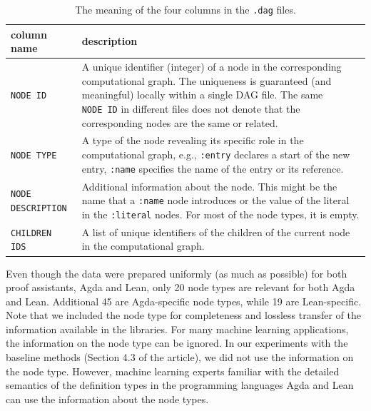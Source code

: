 \documentclass{article}
\begin{document}
\begin{table}[!htb]
    \caption{The meaning of the four columns in the \texttt{.dag} files.\label{tab:dag-columns}}
    \begin{center}
        \begin{tabular}{l|p{10cm}}
            column name & description \\
            \hline
            \texttt{NODE ID} &
            A unique identifier (integer) of a node in the corresponding computational graph. The uniqueness is guaranteed (and meaningful) locally within a single DAG file. The same \texttt{NODE~ID} in different files does not denote that the corresponding nodes are the same or related.\\
            \rule{0pt}{3ex}
            \texttt{NODE TYPE} &
            A type of the node revealing its specific role in the computational graph, e.g., \texttt{:entry} declares a start of the new entry, \texttt{:name} specifies the name of the entry or its reference.\\
            \rule{0pt}{3ex}
            \texttt{NODE DESCRIPTION} &
            Additional information about the node. This might be the name that a \texttt{:name} node introduces or the value of the literal in the \texttt{:literal} nodes. For most of the node types, it is empty.\\
            \rule{0pt}{3ex}
            \texttt{CHILDREN IDS} & A list of unique identifiers of the children of the current node in the computational graph.
        \end{tabular}
    \end{center}
\end{table}

Even though the data were prepared uniformly (as much as possible) for both proof assistants, Agda and Lean, only 20 node types are relevant for both Agda and Lean. Additional 45 are Agda-specific node types, while 19 are Lean-specific. Note that we included the node type for completeness and lossless transfer of the information available in the libraries. For many machine learning applications, the information on the node type can be ignored. In our experiments with the baseline methods (Section 4.3 of the article), we did not use the information on the node type. However, machine learning experts familiar with the detailed semantics of the definition types in the programming languages Agda and Lean can use the information about the node types.
\end{document}
